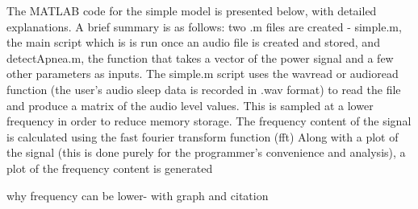  The MATLAB\textsuperscript{\textregistered{}} code for the simple model is presented below, with detailed explanations. A brief summary is as follows: two .m files are created - simple.m, the main script which is is run once an audio file is created and stored, and detectApnea.m, the function that takes a vector of the power signal and a few other parameters as inputs. The simple.m script uses the wavread or audioread function (the user's audio sleep data is recorded in .wav format) to read the file and produce a matrix of the audio level values. This is sampled at a lower frequency in order to reduce memory storage. The frequency content of the signal is calculated using the fast fourier transform function (fft) Along with a plot of the signal (this is done purely for the programmer's convenience and analysis), a plot of the frequency content is generated

why frequency can be lower- with graph and citation